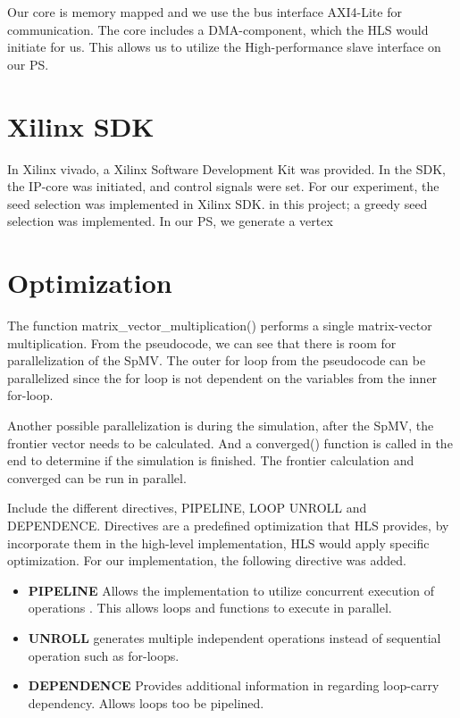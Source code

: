 Our core is memory mapped and we use the bus interface AXI4-Lite for communication. The core includes a DMA-component, which the HLS would initiate for us. This allows us to utilize the High-performance slave interface on our PS.


\section{Xilinx SDK}
In Xilinx vivado, a Xilinx Software Development Kit was provided. In the SDK, the IP-core was initiated, and control signals were set. For our experiment, the seed selection was implemented in Xilinx SDK. in this project; a greedy seed selection was implemented. In our PS, we generate a vertex 



\section{Optimization}
The function matrix\_vector\_multiplication() performs a single matrix-vector multiplication. From the pseudocode, we can see that there is room for parallelization of the SpMV. The outer for loop from the pseudocode can be parallelized since the for loop is not dependent on the variables from the inner for-loop. 

Another possible parallelization is during the simulation, after the SpMV, the frontier vector needs to be calculated. And a converged() function is called in the end to determine if the simulation is finished. The frontier calculation and converged can be run in parallel. 

Include the different directives, PIPELINE, LOOP UNROLL and DEPENDENCE. Directives are a predefined optimization that HLS provides, by incorporate them in the high-level implementation, HLS would apply specific optimization. For our implementation, the following directive was added.

\begin{itemize}
\item \textbf{PIPELINE} Allows the implementation to utilize concurrent execution of operations \citep{optiDirect}. This allows loops and functions to execute in parallel. 
\item \textbf{UNROLL} generates multiple independent operations instead of sequential operation such as for-loops.\citep{optiDirect}
\item \textbf{DEPENDENCE} Provides additional information in regarding loop-carry dependency. Allows loops too be pipelined.\citep{optiDirect}
\end{itemize}

